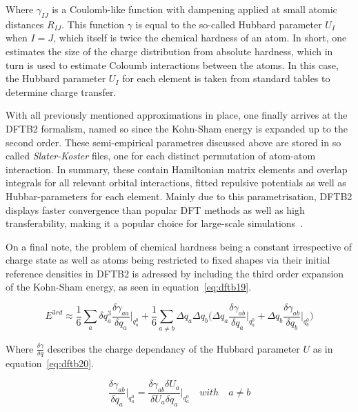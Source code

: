 \documentclass[12pt]{article}
\begin{document}
\noindent Where $\gamma_{IJ}$ is a Coulomb-like function with dampening applied at small atomic distances $R_{IJ}$.
This function $\gamma$ is equal to the so-called Hubbard parameter $U_I$ when $I=J$, which itself is twice the chemical hardness of an atom.
In short, one estimates the size of the charge distribution from absolute hardness, which in turn is used to estimate Coloumb interactions between the atoms.
In this case, the Hubbard parameter $U_I$ for each element is taken from standard tables to determine charge transfer.
\\ \par \noindent 
With all previously mentioned approximations in place, one finally arrives at the DFTB2 formalism, named so since the Kohn-Sham energy is expanded up to the second order. 
These semi-empirical parametres discussed above are stored in so called \textit{Slater-Koster} files, one for each distinct permutation of atom-atom interaction. In summary, these contain Hamiltonian matrix elements and overlap integrals for all relevant orbital interactions, fitted repulsive potentials as well as Hubbar-parameters for each element.
Mainly due to this parametrisation, DFTB2 displays faster convergence than popular DFT methods as well as high transferability, making it a popular choice for large-scale simulations~\cite{Hofer2023}.
\\ \par \noindent
On a final note, the problem of chemical hardness being a constant irrespective of charge state as well as atoms being restricted to fixed shapes via their initial reference densities in DFTB2 is adressed by including the third order expansion of the Kohn-Sham energy, as seen in equation~\ref{eq:dftb19}.

\begin{equation}
  E^{3rd} \approx \frac{1}{6}\sum_{a}^{}\delta q_a^3\frac{\delta\gamma_{aa}}{\delta q_a}\Biggr|_{q_a^0} + \frac{1}{6}\sum_{a \neq b}^{}\Delta q_a \Delta q_b \Biggl( \Delta q_a \frac{\delta \gamma_{ab}}{\delta q_a}\Biggr|_{q_a^0} + \Delta q_b \frac{\delta \gamma_{ab}}{\delta q_b}\Biggr|_{q_b^0} \Biggr)
    \label{eq:dftb19}
\end{equation}

\bigskip

\noindent Where $\frac{\delta\gamma}{\delta q}$ describes the charge dependancy of the Hubbard parameter $U$ as in equation~\ref{eq:dftb20}.

\begin{equation}
  \frac{\delta\gamma_{ab}}{\delta q_a}\Biggr|_{q_a^0} = \frac{\delta\gamma_{ab}\delta U_a}{\delta U_a\delta q_a}\Biggr|_{q_a^0} \quad with \quad a\neq b
  \label{eq:dftb20}
\end{equation}
\end{document}
